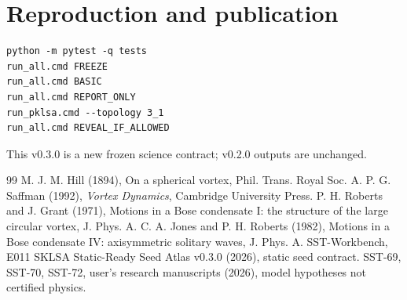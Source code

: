 \documentclass[10pt,a4paper]{article}
\begin{document}
\section{Reproduction and publication}
\begin{verbatim}
python -m pytest -q tests
run_all.cmd FREEZE
run_all.cmd BASIC
run_all.cmd REPORT_ONLY
run_pklsa.cmd --topology 3_1
run_all.cmd REVEAL_IF_ALLOWED
\end{verbatim}
This v0.3.0 is a new frozen science contract; v0.2.0 outputs are unchanged.
\begin{thebibliography}{99}
 M. J. M. Hill (1894), On a spherical vortex, Phil. Trans. Royal Soc. A.
 P. G. Saffman (1992), \emph{Vortex Dynamics}, Cambridge University Press.
 P. H. Roberts and J. Grant (1971), Motions in a Bose condensate I: the structure of the large circular vortex, J. Phys. A.
 C. A. Jones and P. H. Roberts (1982), Motions in a Bose condensate IV: axisymmetric solitary waves, J. Phys. A.
 SST-Workbench, E011 SKLSA Static-Ready Seed Atlas v0.3.0 (2026), static seed contract.
 SST-69, SST-70, SST-72, user's research manuscripts (2026), model hypotheses not certified physics.
\end{thebibliography}
\end{document}
